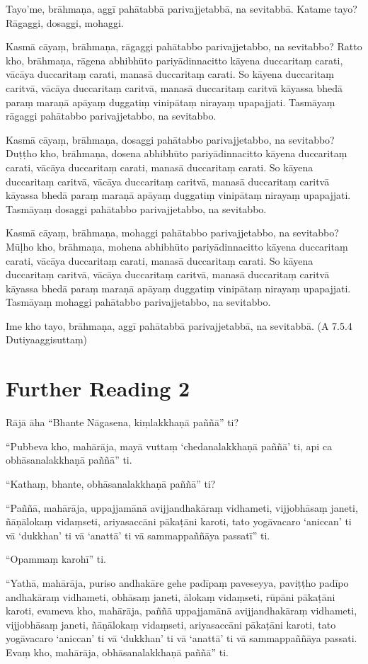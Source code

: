 Tayo’me, brāhmaṇa, aggī pahātabbā parivajjetabbā, na sevitabbā. Katame tayo? Rāgaggi, dosaggi, mohaggi.

Kasmā cāyaṃ, brāhmaṇa, rāgaggi pahātabbo parivajjetabbo, na sevitabbo? Ratto kho, brāhmaṇa, rāgena abhibhūto pariyādinnacitto kāyena duccaritaṃ carati, vācāya duccaritaṃ carati, manasā duccaritaṃ carati. So kāyena duccaritaṃ caritvā, vācāya duccaritaṃ caritvā, manasā duccaritaṃ caritvā kāyassa bhedā paraṃ maraṇā apāyaṃ duggatiṃ vinipātaṃ nirayaṃ upapajjati. Tasmāyaṃ rāgaggi pahātabbo parivajjetabbo, na sevitabbo.

Kasmā cāyaṃ, brāhmaṇa, dosaggi pahātabbo parivajjetabbo, na sevitabbo? Duṭṭho kho, brāhmaṇa, dosena abhibhūto pariyādinnacitto kāyena duccaritaṃ carati, vācāya duccaritaṃ carati, manasā duccaritaṃ carati. So kāyena duccaritaṃ caritvā, vācāya duccaritaṃ caritvā, manasā duccaritaṃ caritvā kāyassa bhedā paraṃ maraṇā apāyaṃ duggatiṃ vinipātaṃ nirayaṃ upapajjati. Tasmāyaṃ dosaggi pahātabbo parivajjetabbo, na sevitabbo.

Kasmā cāyaṃ, brāhmaṇa, mohaggi pahātabbo parivajjetabbo, na sevitabbo? Mūḷho kho, brāhmaṇa, mohena abhibhūto pariyādinnacitto kāyena duccaritaṃ carati, vācāya duccaritaṃ carati, manasā duccaritaṃ carati. So kāyena duccaritaṃ caritvā, vācāya duccaritaṃ caritvā, manasā duccaritaṃ caritvā kāyassa bhedā paraṃ maraṇā apāyaṃ duggatiṃ vinipātaṃ nirayaṃ upapajjati. Tasmāyaṃ mohaggi pahātabbo parivajjetabbo, na sevitabbo.

Ime kho tayo, brāhmaṇa, aggī pahātabbā parivajjetabbā, na sevitabbā. (A 7.5.4 Dutiyaaggisuttaṃ)

\section*{Further Reading 2}

Rājā āha “Bhante Nāgasena, kiṃlakkhaṇā paññā” ti?

“Pubbeva kho, mahārāja, mayā vuttaṃ ‘chedanalakkhaṇā paññā’ ti, api ca obhāsanalakkhaṇā paññā” ti.

“Kathaṃ, bhante, obhāsanalakkhaṇā paññā” ti?

“Paññā, mahārāja, uppajjamānā avijjandhakāraṃ vidhameti, vijjobhāsaṃ janeti, ñāṇālokaṃ vidaṃseti, ariyasaccāni pākaṭāni karoti, tato yogāvacaro ‘aniccan’ ti vā ‘dukkhan’ ti vā ‘anattā’ ti vā sammappaññāya passatī” ti.

“Opammaṃ karohī” ti.

“Yathā, mahārāja, puriso andhakāre gehe padīpaṃ paveseyya, paviṭṭho padīpo andhakāraṃ vidhameti, obhāsaṃ janeti, ālokaṃ vidaṃseti, rūpāni pākaṭāni karoti, evameva kho, mahārāja, paññā uppajjamānā avijjandhakāraṃ vidhameti, vijjobhāsaṃ janeti, ñāṇālokaṃ vidaṃseti, ariyasaccāni pākaṭāni karoti, tato yogāvacaro ‘aniccan’ ti vā ‘dukkhan’ ti vā ‘anattā’ ti vā sammappaññāya passati. Evaṃ kho, mahārāja, obhāsanalakkhaṇā paññā” ti.

